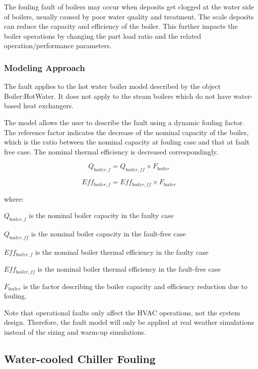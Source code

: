 The fouling fault of boilers may occur when deposits get clogged at the water side of boilers, usually caused by poor water quality and treatment. The scale deposits can reduce the capacity and efficiency of the boiler. This further impacts the boiler operations by changing the part load ratio and the related operation/performance parameters.

\subsubsection{Modeling Approach}

The fault applies to the hot water boiler model described by the object Boiler:HotWater. It does not apply to the steam boilers which do not have water-based heat exchangers.

The model allows the user to describe the fault using a dynamic fouling factor. The reference factor indicates the decrease of the nominal capacity of the boiler, which is the ratio between the nominal capacity at fouling case and that at fault free case. The nominal thermal efficiency is decreased correspondingly.

\begin{equation}
Q_{boiler,f} = Q_{boiler,ff} \times F_{boiler}
\end{equation}

\begin{equation}
Eff_{boiler,f} = Eff_{boiler,ff} \times F_{boiler}
\end{equation}

where:

\(Q_{boiler,f}\) is the nominal boiler capacity in the faulty case

\(Q_{boiler,ff}\) is the nominal boiler capacity in the fault-free case

\(Eff_{boiler,f}\) is the nominal boiler thermal efficiency in the faulty case

\(Eff_{boiler,ff}\) is the nominal boiler thermal efficiency in the fault-free case

\(F_{boiler}\) is the factor describing the boiler capacity and efficiency reduction due to fouling.

Note that operational faults only affect the HVAC operations, not the system design. Therefore, the fault model will only be applied at real weather simulations instead of the sizing and warm-up simulations.


\subsection{Water-cooled Chiller Fouling}\label{water-cooled-chiller-fouling}

